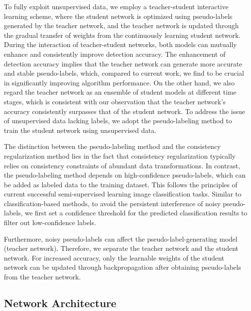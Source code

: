 \documentclass[conference]{IEEEtran}
\begin{document}
To fully exploit unsupervised data, we employ a teacher-student interactive learning scheme, where the student network is optimized using pseudo-labels generated by the teacher network, and the teacher network is updated through the gradual transfer of weights from the continuously learning student network. During the interaction of teacher-student networks, both models can mutually enhance and consistently improve detection accuracy. The enhancement of detection accuracy implies that the teacher network can generate more accurate and stable pseudo-labels, which, compared to current work, we find to be crucial in significantly improving algorithm performance. On the other hand, we also regard the teacher network as an ensemble of student models at different time stages, which is consistent with our observation that the teacher network's accuracy consistently surpasses that of the student network. To address the issue of unsupervised data lacking labels, we adopt the pseudo-labeling method to train the student network using unsupervised data.

The distinction between the pseudo-labeling method and the consistency regularization method lies in the fact that consistency regularization typically relies on consistency constraints of abundant data transformations. In contrast, the pseudo-labeling method depends on high-confidence pseudo-labels, which can be added as labeled data to the training dataset. This follows the principles of current successful semi-supervised learning image classification tasks. Similar to classification-based methods, to avoid the persistent interference of noisy pseudo-labels, we first set a confidence threshold for the predicted classification results to filter out low-confidence labels.

Furthermore, noisy pseudo-labels can affect the pseudo-label-generating model (teacher network). Therefore, we separate the teacher network and the student network. For increased accuracy, only the learnable weights of the student network can be updated through backpropagation after obtaining pseudo-labels from the teacher network.

\subsection{Network Architecture}
\end{document}
